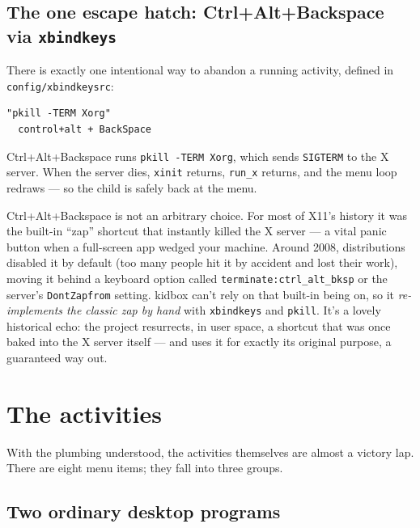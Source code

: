 \documentclass[11pt,oneside]{article}
\newcommand{\code}[1]{\texorpdfstring{\textcolor{kbblue}{\texttt{#1}}}{#1}}
\newcommand{\file}[1]{\textcolor{kbteal}{\texttt{#1}}}
\begin{document}
\subsection{The one escape hatch: Ctrl+Alt+Backspace via \texttt{xbindkeys}}

There is exactly one intentional way to abandon a running activity, defined in
\file{config/xbindkeysrc}:

\begin{lstlisting}
"pkill -TERM Xorg"
  control+alt + BackSpace
\end{lstlisting}

Ctrl+Alt+Backspace runs \code{pkill -TERM Xorg}, which sends \texttt{SIGTERM} to
the X server. When the server dies, \texttt{xinit} returns, \code{run\_x}
returns, and the menu loop redraws --- so the child is safely back at the menu.

\begin{deeper}
Ctrl+Alt+Backspace is not an arbitrary choice. For most of X11's history it was
the built-in ``zap'' shortcut that instantly killed the X server --- a vital
panic button when a full-screen app wedged your machine. Around 2008,
distributions disabled it by default (too many people hit it by accident and
lost their work), moving it behind a keyboard option called
\texttt{terminate:ctrl\_alt\_bksp} or the server's \code{DontZapfrom} setting.
kidbox can't rely on that built-in being on, so it \emph{re-implements the
classic zap by hand} with \texttt{xbindkeys} and \texttt{pkill}. It's a lovely
historical echo: the project resurrects, in user space, a shortcut that was once
baked into the X server itself --- and uses it for exactly its original purpose,
a guaranteed way out.
\end{deeper}

\section{The activities}

With the plumbing understood, the activities themselves are almost a victory
lap. There are eight menu items; they fall into three groups.

\subsection{Two ordinary desktop programs}
\end{document}
